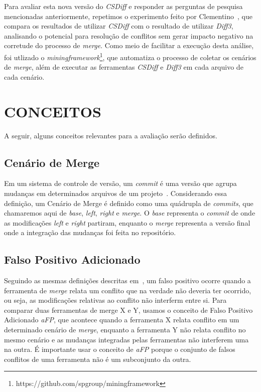 Para avaliar esta nova versão do \emph{CSDiff} e responder as perguntas de
pesquisa mencionadas anteriormente, repetimos o experimento feito por
Clementino~\cite{heitor21,clem21}, que compara os resultados de utilizar
\emph{CSDiff} com o resultado de utilizar \emph{Diff3}, analisando o potencial
para resolução de conflitos sem gerar impacto negativo na corretude do processo
de \emph{merge}. Como meio de facilitar a execução desta análise, foi utlizado
o \emph{miningframework}\footnote{https://github.com/spgroup/miningframework},
que automatiza o processo de coletar os cenários de \emph{merge}, além de
executar as ferramentas \emph{CSDiff} e \emph{Diff3} em cada arquivo de cada
cenário.

\section{CONCEITOS}\label{conceitos}
A seguir, alguns conceitos relevantes para a avaliação serão definidos.

\subsection{Cenário de Merge}
Em um sistema de controle de versão, um \emph{commit} é uma versão que agrupa
mudanças em determinados arquivos de um projeto~\cite{koc11}. Considerando essa
definição, um Cenário de Merge é definido como uma quádrupla de \emph{commits},
que chamaremos aqui de \emph{base}, \emph{left}, \emph{right} e \emph{merge}. O
\emph{base} representa o \emph{commit} de onde as modificações \emph{left} e
\emph{right} partiram, enquanto o \emph{merge} representa a versão final onde a
integração das mudanças foi feita no repositório.

\subsection{Falso Positivo Adicionado}
Seguindo as mesmas definições descritas em~\cite{clem21}, um falso positivo
ocorre quando a ferramenta de \emph{merge} relata um conflito que na verdade
não deveria ter ocorrido, ou seja, as modificações relativas ao conflito não
interferm entre si. Para comparar duas ferramentas de merge X e Y, usamos o
conceito de Falso Positivo Adicionado \emph{aFP}, que acontece quando a
ferramenta X relata conflito em um determinado cenário de \emph{merge},
enquanto a ferramenta Y não relata conflito no mesmo cenário e as mudanças
integradas pelas ferramentas não interferem uma na outra. É importante usar o
conceito de \emph{aFP} porque o conjunto de falsos conflitos de uma ferramenta
não é um subconjunto da outra.

